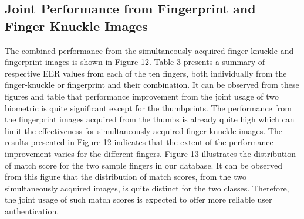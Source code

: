 \subsection{Joint Performance from Fingerprint and Finger Knuckle Images}

The combined performance from the simultaneously acquired finger knuckle and fingerprint images is shown in Figure 12. Table 3 presents a summary of respective EER values from each of the ten fingers, both individually from the finger-knuckle or fingerprint and their combination. It can be observed from these figures and table that performance improvement from the joint usage of two biometric is quite significant except for the thumbprints. The performance from the fingerprint images acquired from the thumbs is already quite high which can limit the effectiveness for simultaneously acquired finger knuckle images. The results presented in Figure 12 indicates that the extent of the performance improvement varies for the different fingers. Figure 13 illustrates the distribution of match score for the two sample fingers in our database. It can be observed from this figure that the distribution of match scores, from the two simultaneously acquired images, is quite distinct for the two classes. Therefore, the joint usage of such match scores is expected to offer more reliable user authentication.